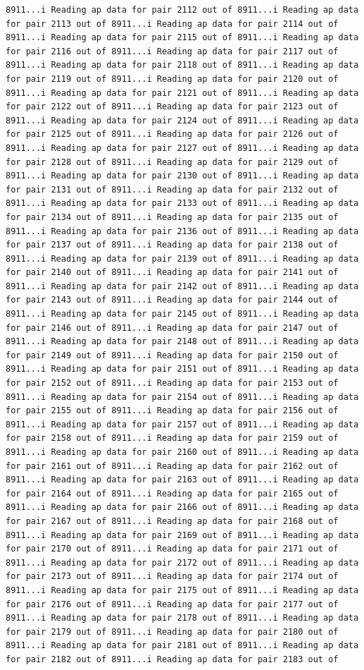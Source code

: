 \documentclass[
]{article}
\begin{document}
\begin{verbatim}
8911...i Reading ap data for pair 2112 out of 8911...i Reading ap data for pair 2113 out of 8911...i Reading ap data for pair 2114 out of 8911...i Reading ap data for pair 2115 out of 8911...i Reading ap data for pair 2116 out of 8911...i Reading ap data for pair 2117 out of 8911...i Reading ap data for pair 2118 out of 8911...i Reading ap data for pair 2119 out of 8911...i Reading ap data for pair 2120 out of 8911...i Reading ap data for pair 2121 out of 8911...i Reading ap data for pair 2122 out of 8911...i Reading ap data for pair 2123 out of 8911...i Reading ap data for pair 2124 out of 8911...i Reading ap data for pair 2125 out of 8911...i Reading ap data for pair 2126 out of 8911...i Reading ap data for pair 2127 out of 8911...i Reading ap data for pair 2128 out of 8911...i Reading ap data for pair 2129 out of 8911...i Reading ap data for pair 2130 out of 8911...i Reading ap data for pair 2131 out of 8911...i Reading ap data for pair 2132 out of 8911...i Reading ap data for pair 2133 out of 8911...i Reading ap data for pair 2134 out of 8911...i Reading ap data for pair 2135 out of 8911...i Reading ap data for pair 2136 out of 8911...i Reading ap data for pair 2137 out of 8911...i Reading ap data for pair 2138 out of 8911...i Reading ap data for pair 2139 out of 8911...i Reading ap data for pair 2140 out of 8911...i Reading ap data for pair 2141 out of 8911...i Reading ap data for pair 2142 out of 8911...i Reading ap data for pair 2143 out of 8911...i Reading ap data for pair 2144 out of 8911...i Reading ap data for pair 2145 out of 8911...i Reading ap data for pair 2146 out of 8911...i Reading ap data for pair 2147 out of 8911...i Reading ap data for pair 2148 out of 8911...i Reading ap data for pair 2149 out of 8911...i Reading ap data for pair 2150 out of 8911...i Reading ap data for pair 2151 out of 8911...i Reading ap data for pair 2152 out of 8911...i Reading ap data for pair 2153 out of 8911...i Reading ap data for pair 2154 out of 8911...i Reading ap data for pair 2155 out of 8911...i Reading ap data for pair 2156 out of 8911...i Reading ap data for pair 2157 out of 8911...i Reading ap data for pair 2158 out of 8911...i Reading ap data for pair 2159 out of 8911...i Reading ap data for pair 2160 out of 8911...i Reading ap data for pair 2161 out of 8911...i Reading ap data for pair 2162 out of 8911...i Reading ap data for pair 2163 out of 8911...i Reading ap data for pair 2164 out of 8911...i Reading ap data for pair 2165 out of 8911...i Reading ap data for pair 2166 out of 8911...i Reading ap data for pair 2167 out of 8911...i Reading ap data for pair 2168 out of 8911...i Reading ap data for pair 2169 out of 8911...i Reading ap data for pair 2170 out of 8911...i Reading ap data for pair 2171 out of 8911...i Reading ap data for pair 2172 out of 8911...i Reading ap data for pair 2173 out of 8911...i Reading ap data for pair 2174 out of 8911...i Reading ap data for pair 2175 out of 8911...i Reading ap data for pair 2176 out of 8911...i Reading ap data for pair 2177 out of 8911...i Reading ap data for pair 2178 out of 8911...i Reading ap data for pair 2179 out of 8911...i Reading ap data for pair 2180 out of 8911...i Reading ap data for pair 2181 out of 8911...i Reading ap data for pair 2182 out of 8911...i Reading ap data for pair 2183 out of 
\end{verbatim}
\end{document}

